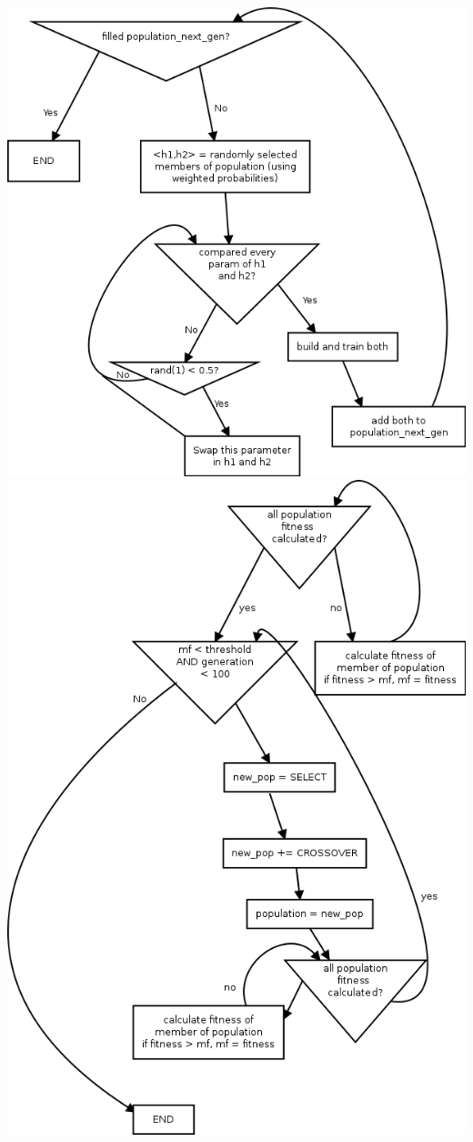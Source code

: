 \documentclass[11pt]{article}
\begin{document}
\includegraphics[width=\linewidth]{crossover.png}
\includegraphics[width=\linewidth]{genetic_algorithm_diagram.png}
\end{document}
